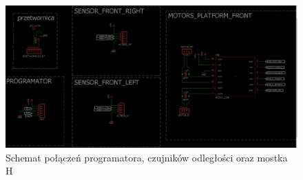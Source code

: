 \documentclass[10pt, a4paper]{report}
\begin{document}
\begin{figure}[!h]
	\centering
	\includegraphics[scale=0.5, width=\textwidth ,height=\textheight ,keepaspectratio]{czujniki.png}
	\caption{Schemat połączeń programatora, czujników odległości oraz mostka H}
\end{figure}
\end{document}
